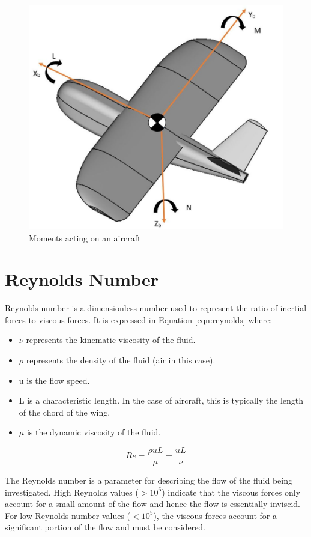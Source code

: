 
\begin{figure}[H]
  \centering
   \includegraphics[width=0.7\linewidth]{03_LiteratureReview/Figs/axes2.JPG}
  \caption{Moments acting on an aircraft}
  \label{fig:pitch}
\end{figure}




\section{Reynolds Number} \label{sec:Reynolds}
Reynolds number is a dimensionless number used to represent the ratio of inertial forces to viscous forces. It is expressed in Equation \ref{eqn:reynolds} where:

\begin{itemize}
    \item $\nu$ represents the kinematic viscosity of the fluid.
    \item $\rho$ represents the density of the fluid (air in this case).
    \item u is the flow speed.
    \item L is a characteristic length. In the case of aircraft, this is typically the length of the chord of the wing.
    \item $\mu$ is the dynamic viscosity of the fluid.
\end{itemize} 

\begin{equation}
    Re = \frac{\rho uL}{\mu} = \frac{uL}{\nu}
    \label{eqn:reynolds}
\end{equation}


The Reynolds number is a parameter for describing the flow of the fluid being investigated. High Reynolds values ($> 10^{6}$) indicate that the viscous forces only account for a small amount of the flow and hence the flow is essentially inviscid. For low Reynolds number values ($< 10^{5}$), the viscous forces account for a significant portion of the flow and must be considered.




